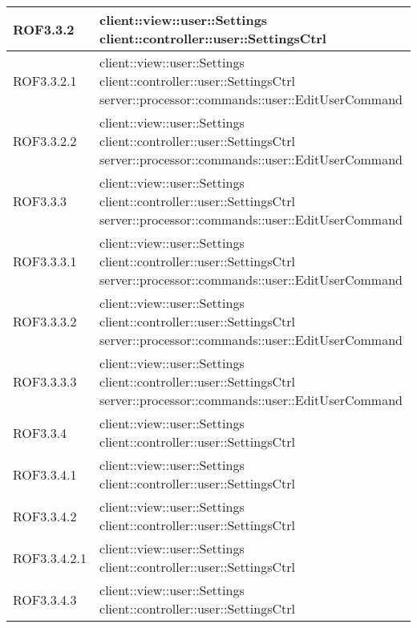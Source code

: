 \begin{center}
\begin{longtable}{| p{2.5cm} | p{11cm} |}
\hline
ROF3.3.2 & client::view::user::Settings \newline client::controller::user::SettingsCtrl \\
\hline
ROF3.3.2.1 & client::view::user::Settings \newline client::controller::user::SettingsCtrl \newline server::processor::commands::user::EditUserCommand \\
\hline
ROF3.3.2.2 & client::view::user::Settings \newline client::controller::user::SettingsCtrl \newline server::processor::commands::user::EditUserCommand \\
\hline
ROF3.3.3 & client::view::user::Settings \newline client::controller::user::SettingsCtrl \newline server::processor::commands::user::EditUserCommand \\
\hline
ROF3.3.3.1 & client::view::user::Settings \newline client::controller::user::SettingsCtrl \newline server::processor::commands::user::EditUserCommand \\
\hline
ROF3.3.3.2 & client::view::user::Settings \newline client::controller::user::SettingsCtrl \newline server::processor::commands::user::EditUserCommand \\
\hline
ROF3.3.3.3 & client::view::user::Settings \newline client::controller::user::SettingsCtrl \newline server::processor::commands::user::EditUserCommand \\
\hline
ROF3.3.4 & client::view::user::Settings \newline client::controller::user::SettingsCtrl \\
\hline
ROF3.3.4.1 & client::view::user::Settings \newline client::controller::user::SettingsCtrl \\
\hline
ROF3.3.4.2 & client::view::user::Settings \newline client::controller::user::SettingsCtrl \\
\hline
ROF3.3.4.2.1 & client::view::user::Settings \newline client::controller::user::SettingsCtrl \\
\hline
ROF3.3.4.3 & client::view::user::Settings \newline client::controller::user::SettingsCtrl \\

\end{longtable}
\end{center}
